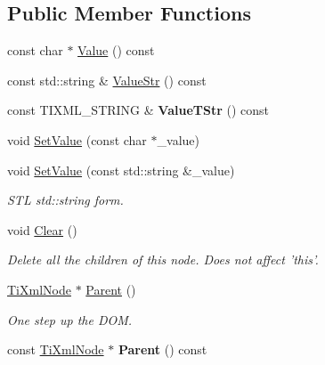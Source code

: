 \subsection*{Public Member Functions}
\begin{DoxyCompactItemize}
\item 
const char $\ast$ \hyperlink{class_ti_xml_node_a77943eb90d12c2892b1337a9f5918b41}{Value} () const 
\item 
const std::string \& \hyperlink{class_ti_xml_node_a6d9e505619d39bf50bfd9609c9169ea5}{ValueStr} () const 
\item 
\hypertarget{class_ti_xml_node_a83ece13d2ea66dac66e0b21332229239}{
const TIXML\_\-STRING \& {\bfseries ValueTStr} () const }
\label{class_ti_xml_node_a83ece13d2ea66dac66e0b21332229239}

\item 
void \hyperlink{class_ti_xml_node_a2a38329ca5d3f28f98ce932b8299ae90}{SetValue} (const char $\ast$\_\-value)
\item 
\hypertarget{class_ti_xml_node_a2598d5f448042c1abbeae4503dd45ff2}{
void \hyperlink{class_ti_xml_node_a2598d5f448042c1abbeae4503dd45ff2}{SetValue} (const std::string \&\_\-value)}
\label{class_ti_xml_node_a2598d5f448042c1abbeae4503dd45ff2}

\begin{DoxyCompactList}\small\item\em STL std::string form. \item\end{DoxyCompactList}\item 
\hypertarget{class_ti_xml_node_a708e7f953df61d4d2d12f73171550a4b}{
void \hyperlink{class_ti_xml_node_a708e7f953df61d4d2d12f73171550a4b}{Clear} ()}
\label{class_ti_xml_node_a708e7f953df61d4d2d12f73171550a4b}

\begin{DoxyCompactList}\small\item\em Delete all the children of this node. Does not affect 'this'. \item\end{DoxyCompactList}\item 
\hypertarget{class_ti_xml_node_ab643043132ffd794f8602685d34a982e}{
\hyperlink{class_ti_xml_node}{TiXmlNode} $\ast$ \hyperlink{class_ti_xml_node_ab643043132ffd794f8602685d34a982e}{Parent} ()}
\label{class_ti_xml_node_ab643043132ffd794f8602685d34a982e}

\begin{DoxyCompactList}\small\item\em One step up the DOM. \item\end{DoxyCompactList}\item 
\hypertarget{class_ti_xml_node_a78878709e53066f06eb4fcbcdd3a5260}{
const \hyperlink{class_ti_xml_node}{TiXmlNode} $\ast$ {\bfseries Parent} () const }
\label{class_ti_xml_node_a78878709e53066f06eb4fcbcdd3a5260}


\end{DoxyCompactItemize}
